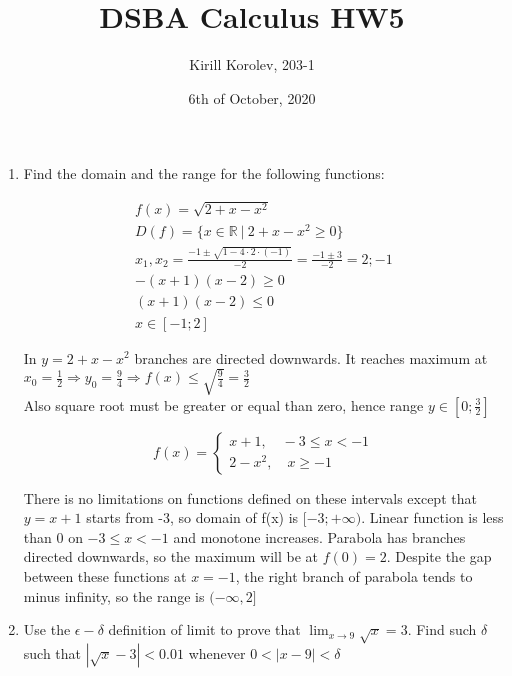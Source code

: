 \documentclass{article}
\title{DSBA Calculus HW5}
\author{Kirill Korolev, 203-1}
\date{6th of October, 2020}
\begin{document}
	
\maketitle

\begin{enumerate}
	\item Find the domain and the range for the following functions:
	
	\begin{align*}
	f(x) = \sqrt{2 + x - x^2}\\
	D(f) = \{x \in \mathbb{R} \:|\: 2 + x - x^2 \geq 0\}\\
	x_1, x_2 = \frac{-1 \pm \sqrt{1 - 4 \cdot 2 \cdot (-1)}}{-2} = \frac{-1 \pm 3}{-2} = 2; -1\\
	-(x + 1)(x - 2) \geq 0\\
	(x + 1)(x - 2) \leq 0\\
	x \in [-1; 2]
	\end{align*}
	
	\begin{center}
		In $y = 2 + x - x^2$ branches are directed downwards. It reaches maximum at $x_0 = \frac{1}{2} \Rightarrow y_0 = \frac{9}{4} \Rightarrow f(x) \leq \sqrt{\frac{9}{4}} = \frac{3}{2}$\\
		Also square root must be greater or equal than zero, hence range $y \in [0; \frac{3}{2}]$
	\end{center}

	\begin{equation*}
	f(x) = 
	\begin{cases*}
		x + 1, \quad -3 \leq x < -1\\
		2 - x^2, \quad x \geq -1
	\end{cases*}
	\end{equation*}
	
	There is no limitations on functions defined on these intervals except that $y = x + 1$ starts from -3, so domain of f(x) is $[-3; +\infty)$. Linear function is less than 0 on $-3 \leq x < -1$ and monotone increases. Parabola has branches directed downwards, so the maximum will be at $f(0) = 2$. Despite the gap between these functions at $x = -1$, the right branch of parabola tends to minus infinity, so the range is $(-\infty, 2]$

\item Use the $\epsilon-\delta$ definition of limit to prove that $\lim_{x \to 9} \sqrt{x} = 3$. Find such $\delta$ such that $|\sqrt{x} - 3| < 0.01$ whenever $0 < |x - 9| < \delta$


\end{enumerate}
\end{document}

